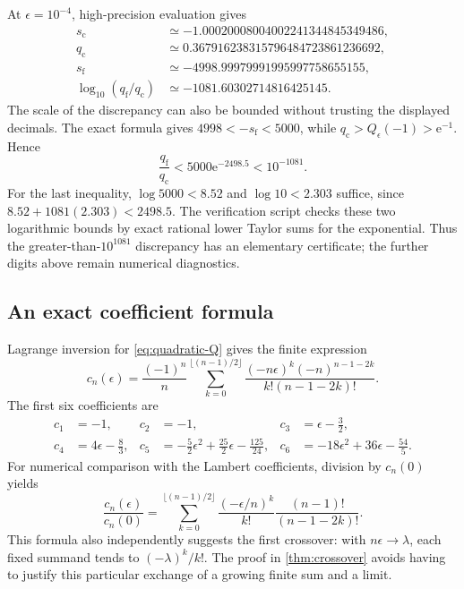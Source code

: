 \documentclass[11pt,a4paper]{article}
\numberwithin{equation}{section}
\theoremstyle{definition}
\theoremstyle{remark}
\newcommand{\e}{\mathrm e}
\newcommand{\scv}{s_{\mathrm c}}
\newcommand{\qcv}{q_{\mathrm c}}
\begin{document}
At $\epsilon=10^{-4}$, high-precision evaluation gives
\begin{align*}
 \scv&\simeq-1.00020008004002241344845349486,\\
 \qcv&\simeq0.367916238315796484723861236692,\\
 s_{\mathrm f}&\simeq-4998.99979991995997758655155,\\
 \log_{10}(q_{\mathrm f}/\qcv)&\simeq-1081.60302714816425145.
\end{align*}
The scale of the discrepancy can also be bounded without trusting the displayed decimals. The exact formula gives $4998<-s_{\mathrm f}<5000$, while $\qcv>Q_\epsilon(-1)>\e^{-1}$. Hence
\begin{equation}
 \frac{q_{\mathrm f}}{\qcv}<5000\e^{-2498.5}<10^{-1081}.
 \label{eq:foreign-certified-scale}
\end{equation}
For the last inequality, $\log5000<8.52$ and $\log10<2.303$ suffice, since $8.52+1081(2.303)<2498.5$. The verification script checks these two logarithmic bounds by exact rational lower Taylor sums for the exponential. Thus the greater-than-$10^{1081}$ discrepancy has an elementary certificate; the further digits above remain numerical diagnostics.

\subsection{An exact coefficient formula}
Lagrange inversion for \eqref{eq:quadratic-Q} gives the finite expression
\begin{equation}
 c_n(\epsilon)=\frac{(-1)^n}{n}
 \sum_{k=0}^{\lfloor(n-1)/2\rfloor}
 \frac{(-n\epsilon)^k(-n)^{n-1-2k}}
      {k!(n-1-2k)!}.
 \label{eq:quadratic-cn}
\end{equation}
The first six coefficients are
\begin{align*}
 c_1&=-1,&c_2&=-1,&c_3&=\epsilon-\frac32,\\
 c_4&=4\epsilon-\frac83,&
 c_5&=-\frac52\epsilon^2+\frac{25}2\epsilon-\frac{125}{24},&
 c_6&=-18\epsilon^2+36\epsilon-\frac{54}5.
\end{align*}
For numerical comparison with the Lambert coefficients, division by $c_n(0)$ yields
\begin{equation}
 \frac{c_n(\epsilon)}{c_n(0)}=
 \sum_{k=0}^{\lfloor(n-1)/2\rfloor}
 \frac{(-\epsilon/n)^k}{k!}
 \frac{(n-1)!}{(n-1-2k)!}.
 \label{eq:quadratic-ratio}
\end{equation}
This formula also independently suggests the first crossover: with $n\epsilon\to\lambda$, each fixed summand tends to $(-\lambda)^k/k!$. The proof in \cref{thm:crossover} avoids having to justify this particular exchange of a growing finite sum and a limit.
\end{document}
